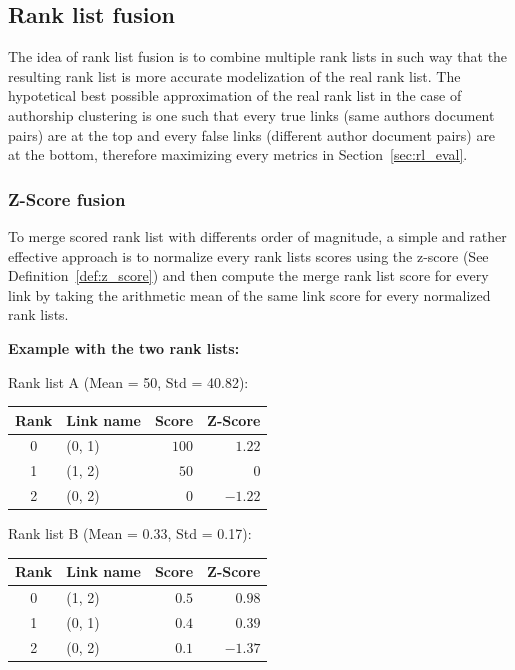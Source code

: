 \subsection{Rank list fusion}
\label{sec:rank_list_fusion}

The idea of rank list fusion is to combine multiple rank lists in such way that the resulting rank list is more accurate modelization of the real rank list.
The hypotetical best possible approximation of the real rank list in the case of authorship clustering is one such that  every true links (same authors document pairs) are at the top and every false links (different author document pairs) are at the bottom, therefore maximizing every metrics in Section~\ref{sec:rl_eval}.

\subsubsection{Z-Score fusion}

To merge scored rank list with differents order of magnitude, a simple and rather effective approach is to normalize every rank lists scores using the z-score (See Definition~\ref{def:z_score}) and then compute the merge rank list score for every link by taking the arithmetic mean of the same link score for every normalized rank lists.

\textbf{Example with the two rank lists:}

Rank list A (Mean = 50, Std = 40.82):

\begin{tabular}{c l r r}
  \toprule
  Rank & Link name & Score & Z-Score \\
  \midrule
  0 & (0, 1) & $100$ & $1.22$ \\
  1 & (1, 2) & $50$ & $0$ \\
  2 & (0, 2) & $0$ & $-1.22$ \\
  \bottomrule
\end{tabular}

Rank list B (Mean = 0.33, Std = 0.17):

\begin{tabular}{c l r r}
  \toprule
  Rank & Link name & Score & Z-Score \\
  \midrule
  0 & (1, 2) & $0.5$ & $0.98$ \\
  1 & (0, 1) & $0.4$ & $0.39$ \\
  2 & (0, 2) & $0.1$ & $-1.37$ \\
  \bottomrule
\end{tabular}

